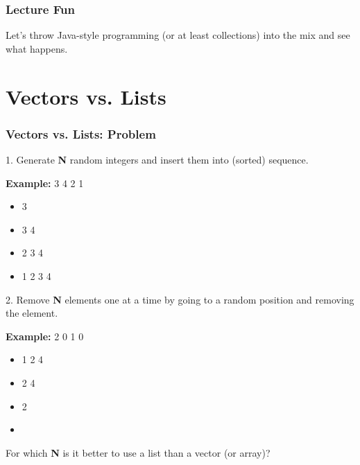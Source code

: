 \begin{frame}
  \frametitle{Lecture Fun}

  \begin{center}
\Large
    Let's throw Java-style programming (or at least collections) into the mix and see what happens.
  \end{center}
\end{frame}

\section{Vectors vs. Lists}
\begin{frame}
  \frametitle{Vectors vs. Lists: Problem}
  
  

    1. Generate {\bf N} random integers and insert them into (sorted)
      sequence.
      
  

      {\bf Example:} 3 4 2 1
      
      \begin{itemize}
        \item 3
        \item 3 4
        \item 2 3 4
        \item 1 2 3 4
      \end{itemize}
  

    2. Remove {\bf N} elements one at a time by going to a random position
      and removing the element.

  
      {\bf Example:} 2 0 1 0
      
      \begin{itemize}
        \item 1 2 4
        \item 2 4
        \item 2
        \item 
      \end{itemize}
  
  For which {\bf N} is it better to use a list than a vector (or array)?
  

\end{frame}

